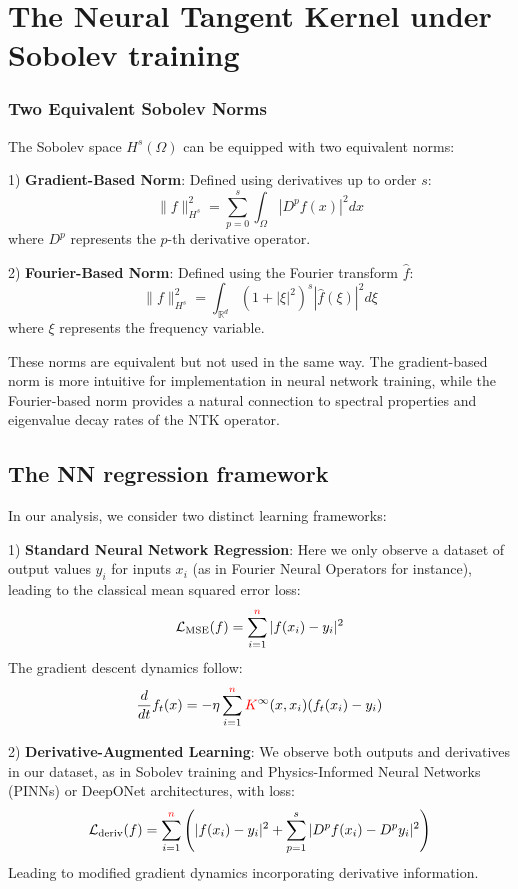 \documentclass[a4paper]{article}
\theoremstyle{plain}
\theoremstyle{definition}
\theoremstyle{remark}
\begin{document}
\newpage
\section{The Neural Tangent Kernel under Sobolev training}
\subsubsection{Two Equivalent Sobolev Norms}

The Sobolev space $H^s(\Omega)$ can be equipped with two equivalent norms:

1) \textbf{Gradient-Based Norm}: Defined using derivatives up to order $s$:
\begin{equation}
\label{eq:sobolev_gradient_norm}
\|f\|_{H^s}^2 = \sum_{p=0}^s \int_{\Omega} |D^p f(x)|^2 dx
\end{equation}
where $D^p$ represents the $p$-th derivative operator.

2) \textbf{Fourier-Based Norm}: Defined using the Fourier transform $\hat{f}$:
\begin{equation}
\label{eq:sobolev_fourier_norm}
\|f\|_{H^s}^2 = \int_{\mathbb{R}^d} (1 + |\xi|^2)^s |\hat{f}(\xi)|^2 d\xi
\end{equation}
where $\xi$ represents the frequency variable.

These norms are equivalent but not used in the same way. 
The gradient-based norm is more intuitive for implementation in neural network training, while the Fourier-based norm provides a natural 
connection to spectral properties and eigenvalue decay rates of the NTK operator.


\subsection{The NN regression framework}

In our analysis, we consider two distinct learning frameworks:

1) \textbf{Standard Neural Network Regression}: Here we only observe a dataset of output values $y_i$ for inputs $x_i$ (as in Fourier Neural Operators for instance), leading to the classical mean squared error loss:
$$\mathcal{L}_{\text{MSE}}(f) = \sum_{i=1}^{\textcolor{red}{n}} |f(x_i) - y_i|^2$$
The gradient descent dynamics follow:
$$\frac{d}{dt}f_t(x) = -\eta \sum_{i=1}^{\textcolor{red}{n}} \textcolor{red}{K}^{\infty}(x,x_i)(f_t(x_i) - y_i)$$

2) \textbf{Derivative-Augmented Learning}: We observe both outputs and derivatives in our dataset, as in Sobolev training and Physics-Informed Neural Networks (PINNs) or DeepONet architectures, with loss:
$$\mathcal{L}_{\text{deriv}}(f) = \sum_{i=1}^{\textcolor{red}{n}} \left(|f(x_i) - y_i|^2 + \sum_{p=1}^s |D^p f(x_i) - D^p y_i|^2\right)$$
Leading to modified gradient dynamics incorporating derivative information.
\end{document}
